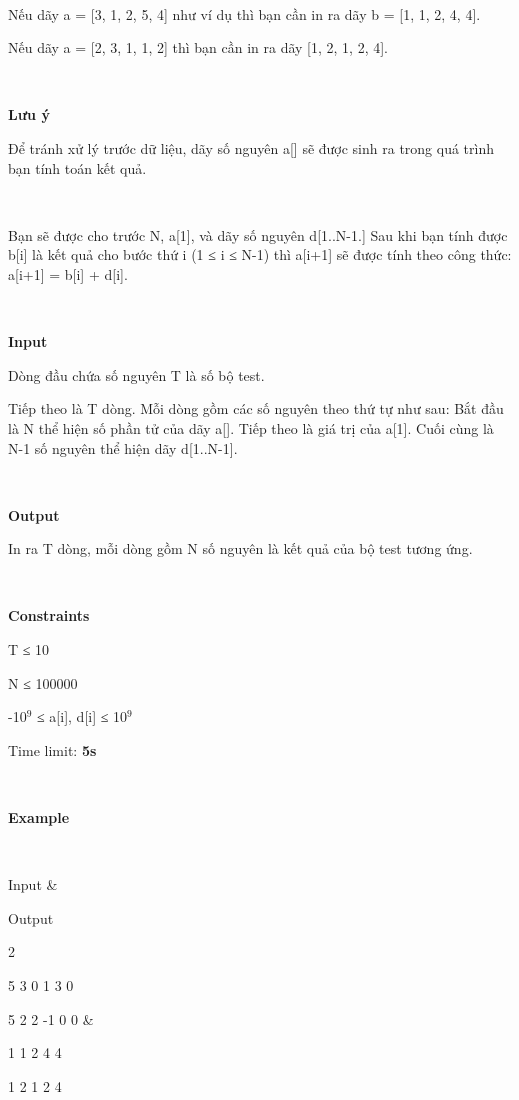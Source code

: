  

Nếu dãy a = [3, 1, 2, 5, 4] như ví dụ thì bạn cần in ra dãy b = [1, 1, 2, 4, 4].

Nếu dãy a = [2, 3, 1, 1, 2] thì bạn cần in ra dãy [1, 2, 1, 2, 4].

 

\textbf{Lưu ý}

Để tránh xử lý trước dữ liệu, dãy số nguyên a[] sẽ được sinh ra trong quá trình bạn tính toán kết quả.

 

Bạn sẽ được cho trước N, a[1], và dãy số nguyên d[1..N-1.] Sau khi bạn tính được b[i] là kết quả cho bước thứ i (1 ≤ i ≤ N-1) thì a[i+1] sẽ được tính theo công thức: a[i+1] = b[i] + d[i].

 

\textbf{Input}

Dòng đầu chứa số nguyên T là số bộ test.

Tiếp theo là T dòng. Mỗi dòng gồm các số nguyên theo thứ tự như sau: Bắt đầu là N thể hiện số phần tử của dãy a[]. Tiếp theo là giá trị của a[1]. Cuối cùng là N-1 số nguyên thể hiện dãy d[1..N-1].

 

\textbf{Output}

In ra T dòng, mỗi dòng gồm N số nguyên là kết quả của bộ test tương ứng.

 

\textbf{Constraints}

T ≤ 10

N ≤ 100000

-10$^9$ ≤ a[i], d[i] ≤ 10$^9$

Time limit: \textbf{5s}

\textbf{ }

\textbf{Example}

 
\begin{tabular}\hline 


Input & 

Output  
\hline


2

5 3 0 1 3 0

5 2 2 -1   0 0 & 

1 1 2 4 4

1   2 1 2 4  
\hline

\end{tabular}

 
